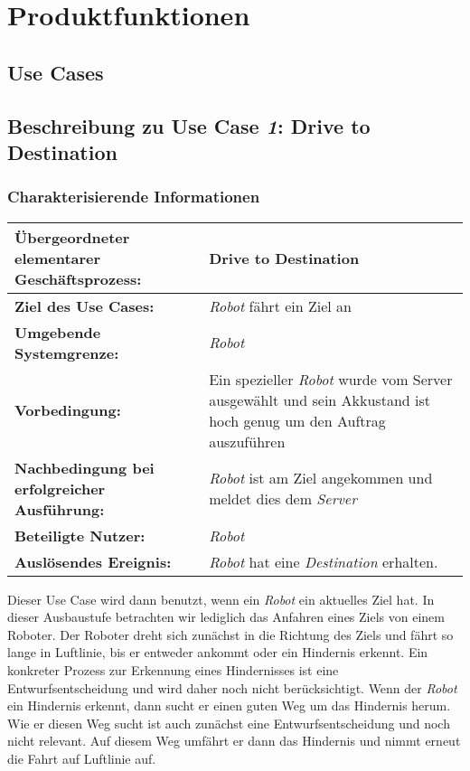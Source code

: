 \documentclass[includeheaders]{scrartcl}
\begin{document}
	\pagebreak

	\section{Produktfunktionen}

		\subsection{Use Cases}

		\subsection{Beschreibung zu Use Case \emph{1}: Drive to Destination}

			\subsubsection*{Charakterisierende Informationen}

			\begin{table}[H]
				\centering
				\begin{tabularx}{\textwidth}{@{}p{5cm}X@{}}
				\toprule
				\textbf{Übergeordneter elementarer Geschäftsprozess:} & Drive to Destination\\ \midrule
				\textbf{Ziel des Use Cases:} & \emph{Robot} fährt ein Ziel an\\ \midrule
				\textbf{Umgebende Systemgrenze:} & \emph{Robot} \\ \midrule
				\textbf{Vorbedingung:} & Ein spezieller \emph{Robot} wurde vom Server ausgewählt und sein Akkustand ist hoch genug um den Auftrag auszuführen \\ \midrule
				\textbf{Nachbedingung bei erfolgreicher Ausführung:} & \emph{Robot} ist am Ziel angekommen und meldet dies dem \emph{Server} \\ \midrule
				\textbf{Beteiligte Nutzer:} & \emph{Robot} \\ \midrule
				\textbf{Auslösendes Ereignis:} & \emph{Robot} hat eine \emph{Destination} erhalten. \\
				\bottomrule
				\end{tabularx}
			\end{table}

			Dieser Use Case wird dann benutzt, wenn ein \emph{Robot} ein aktuelles
			Ziel hat. In dieser Ausbaustufe betrachten wir lediglich das Anfahren
			eines Ziels von einem Roboter. Der Roboter dreht sich zunächst in die
			Richtung des Ziels und fährt so lange in Luftlinie, bis er entweder
			ankommt oder ein Hindernis erkennt. Ein konkreter Prozess zur Erkennung
			eines Hindernisses ist eine Entwurfsentscheidung und wird daher noch
			nicht berücksichtigt. Wenn der \emph{Robot} ein Hindernis erkennt, dann
			sucht er einen guten Weg um das Hindernis herum. Wie er diesen Weg sucht
			ist auch zunächst eine Entwurfsentscheidung und noch nicht relevant. Auf
			diesem Weg umfährt er dann das Hindernis und nimmt erneut die Fahrt auf
			Luftlinie auf.
\end{document}
